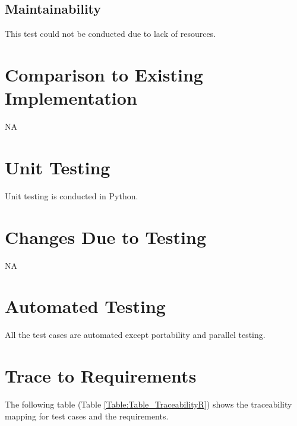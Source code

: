 \documentclass[12pt, titlepage]{article}
\begin{document}
\subsection{Maintainability}

This test could not be conducted due to lack of resources. 
	
\section{Comparison to Existing Implementation}	

NA

\section{Unit Testing} Unit testing is conducted in Python.

\section{Changes Due to Testing} NA

\section{Automated Testing} All the test cases are automated except 
portability and parallel testing.
		
\section{Trace to Requirements} 


The following table (Table \ref{Table:Table_TraceabilityR}) shows the 
traceability mapping for test cases and the 
requirements. 
\end{document}
